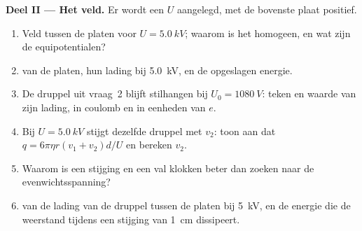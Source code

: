 \begin{problem}
\medskip
\noindent\textbf{Deel II --- Het veld.}
Er wordt een  $U$ aangelegd, met de bovenste plaat positief.
\begin{enumerate}[resume]
  \item Veld tussen de platen voor $U = \qty{5.0}{kV}$; waarom is het
        homogeen, en wat zijn de equipotentialen?
  \item {} van de platen, hun lading bij \qty{5.0}{kV}, en de
        opgeslagen energie.
  \item De druppel uit vraag~2 blijft stilhangen bij $U_0 = \qty{1080}{V}$:
        teken en waarde van zijn lading, in coulomb en in eenheden van $e$.
  \item Bij $U = \qty{5.0}{kV}$ stijgt dezelfde druppel met $v_2$: toon aan dat
        $q = 6\pi\eta r(v_1 + v_2)d/U$ en bereken $v_2$.
  \item Waarom is een stijging en een val klokken beter dan zoeken naar de
        evenwichtsspanning?
  \item {} van de lading van de druppel tussen de platen bij
        \qty{5}{kV}, en de energie die de weerstand tijdens een stijging van
        \qty{1}{cm} dissipeert.
\end{enumerate}


\end{problem}
